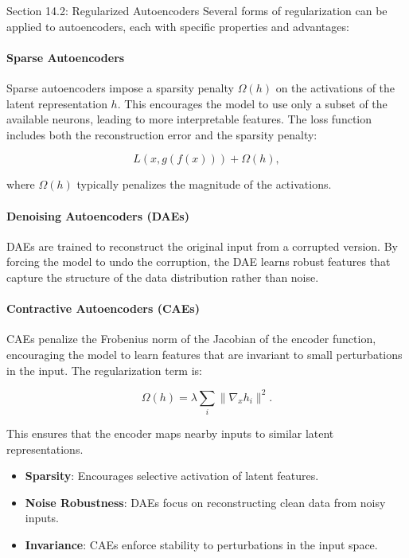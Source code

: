 \begin{notes}{Section 14.2: Regularized Autoencoders}
    Several forms of regularization can be applied to autoencoders, each with specific properties and advantages:
    
    \paragraph{Sparse Autoencoders}  
    Sparse autoencoders impose a sparsity penalty $\Omega(h)$ on the activations of the latent representation $h$. This encourages the model to use only a subset of the available neurons, leading 
    to more interpretable features. The loss function includes both the reconstruction error and the sparsity penalty:
    
    \[
    L(x, g(f(x))) + \Omega(h),
    \]
    
    where $\Omega(h)$ typically penalizes the magnitude of the activations.
    
    \paragraph{Denoising Autoencoders (DAEs)}  
    DAEs are trained to reconstruct the original input from a corrupted version. By forcing the model to undo the corruption, the DAE learns robust features that capture the structure of the data 
    distribution rather than noise.
    
    \paragraph{Contractive Autoencoders (CAEs)}  
    CAEs penalize the Frobenius norm of the Jacobian of the encoder function, encouraging the model to learn features that are invariant to small perturbations in the input. The regularization term is:
    
    \[
    \Omega(h) = \lambda \sum_{i} \| \nabla_x h_i \|^2.
    \]
    
    This ensures that the encoder maps nearby inputs to similar latent representations.
    
    \begin{highlight}
        \begin{itemize}
            \item \textbf{Sparsity}: Encourages selective activation of latent features.
            \item \textbf{Noise Robustness}: DAEs focus on reconstructing clean data from noisy inputs.
            \item \textbf{Invariance}: CAEs enforce stability to perturbations in the input space.
        \end{itemize}
    \end{highlight}
    

\end{notes}
